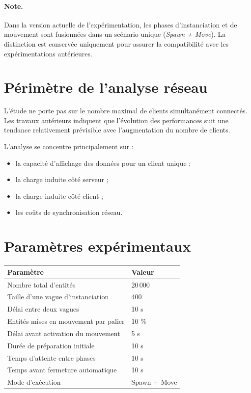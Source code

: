 \documentclass[11pt,a4paper]{article}
\begin{document}
\paragraph{Note.}
Dans la version actuelle de l'expérimentation, les phases d'instanciation et de mouvement sont fusionnées dans un scénario unique (\textit{Spawn + Move}). La distinction est conservée uniquement pour assurer la compatibilité avec les expérimentations antérieures.

\section{Périmètre de l'analyse réseau}

L'étude ne porte pas sur le nombre maximal de clients simultanément connectés. Les travaux antérieurs indiquent que l'évolution des performances suit une tendance relativement prévisible avec l'augmentation du nombre de clients.

L'analyse se concentre principalement sur :

\begin{itemize}
\item la capacité d'affichage des données pour un client unique ;
\item la charge induite côté serveur ;
\item la charge induite côté client ;
\item les coûts de synchronisation réseau.
\end{itemize}

\section{Paramètres expérimentaux}

\begin{table}[h]
\centering
\begin{tabular}{p{7cm}p{2cm}}
\toprule
Paramètre & Valeur \\
\midrule
Nombre total d'entités & 20\,000 \\
Taille d'une vague d'instanciation & 400 \\
Délai entre deux vagues & 10 s \\
Entités mises en mouvement par palier & 10 \% \\
Délai avant activation du mouvement & 5 s \\
Durée de préparation initiale & 10 s \\
Temps d'attente entre phases & 10 s \\
Temps avant fermeture automatique & 10 s \\
Mode d'exécution & Spawn + Move \\
\bottomrule
\end{tabular}
\end{table}
\end{document}
